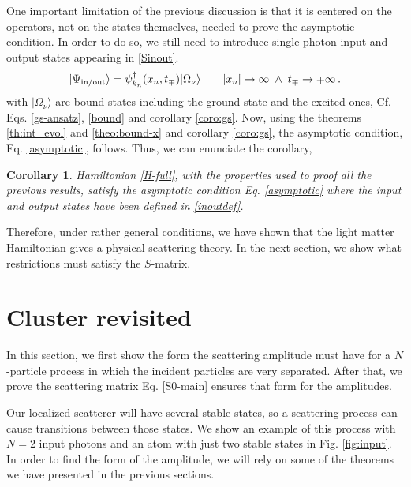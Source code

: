 \documentclass[notitlepage, prx, preprint, amsmath,superscriptaddress,amssymb]{revtex4-1}
\newtheorem{corollary}{Corollary}[section]
\begin{document}
One important limitation of the previous discussion is that it is centered on the operators, not on the states themselves, needed to prove the asymptotic condition.  
In order to do so,  we still need to introduce  single photon input and output states appearing in \eqref{Sinout}.
\begin{equation}
\label{inoutdef}
| \Psi_{\rm in / out} \rangle = 
\psi_{k_n}^\dagger (x_n,t_\mp) | \Omega_\nu  \rangle
\qquad  \vert x_n \vert \to \infty \; \wedge \;  t_\mp \to \mp \infty \, .
\end{equation}
with $\vert \Omega_\nu \rangle$ are bound states including the ground state and the excited ones,  Cf. Eqs. \eqref{gs-ansatz}, \eqref{bound} and corollary \ref{coro:gs}.  
Now, using  the   theorems \ref{th:int_evol}  and  \ref{theo:bound-x} and  corollary \ref{coro:gs},  the asymptotic condition, Eq. \eqref{asymptotic}, follows.  Thus, we can enunciate the corollary,

\begin{corollary}
\label{coro:asymp}
Hamiltonian \eqref{H-full}, with the properties used to proof all the previous results, satisfy the asymptotic condition Eq. \eqref{asymptotic} where the input and output states have been defined in \eqref{inoutdef}.  
\end{corollary}


Therefore, under rather general conditions, we have shown that the light matter Hamiltonian gives a physical scattering theory.  In the next section, we show what restrictions must satisfy the $S$-matrix.


\section{Cluster revisited}

In this section, we first show the form the scattering amplitude must have for a $N$-particle process in which the incident particles are very separated. After that, we prove the scattering matrix Eq. \eqref{S0-main} ensures that form for the amplitudes.

Our localized scatterer will have several stable states, so a scattering process can cause transitions between those states. We show an example of this process with $N=2$ input photons and an atom with just two stable states in Fig. \ref{fig:input}. In order to find the form of the amplitude, we will rely on some of the theorems we have presented in the previous sections.
\end{document}
